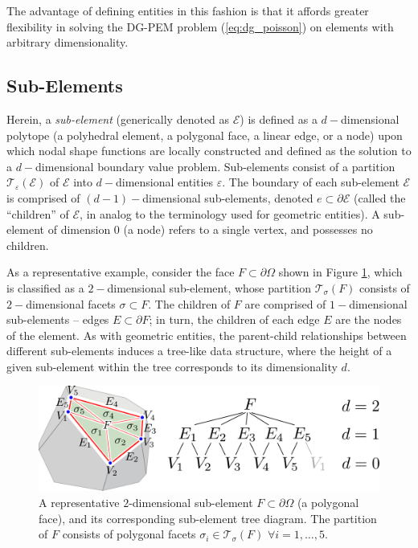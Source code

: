	The advantage of defining entities in this fashion is that it affords greater flexibility in solving the DG-PEM problem (\ref{eq:dg_poisson}) on elements with arbitrary dimensionality.
	
\subsection*{Sub-Elements}

	Herein, a \textit{sub-element} (generically denoted as $\mathcal{E}$) is defined as a $d-$dimensional polytope (a polyhedral element, a polygonal face, a linear edge, or a node) upon which nodal shape functions are locally constructed and defined as the solution to a $d-$dimensional boundary value problem. Sub-elements consist of a partition $\mathcal{T}_{\varepsilon} (\mathcal{E})$ of $\mathcal{E}$ into $d-$dimensional entities $\varepsilon$. The boundary of each sub-element $\mathcal{E}$ is comprised of $(d-1)-$dimensional sub-elements, denoted $e \subset \partial \mathcal{E}$ (called the ``children'' of $\mathcal{E}$, in analog to the terminology used for geometric entities). A sub-element of dimension $0$ (a node) refers to a single vertex, and possesses no children.
	
	As a representative example, consider the face $F \subset \partial \Omega$ shown in Figure \ref{fig:sub_element}, which is classified as a $2-$dimensional sub-element, whose partition $\mathcal{T}_\sigma (F)$ consists of $2-$dimensional facets $\sigma \subset F$. The children of $F$ are comprised of $1-$dimensional sub-elements -- edges $E \subset \partial F$; in turn, the children of each edge $E$ are the nodes of the element. As with geometric entities, the parent-child relationships between different sub-elements induces a tree-like data structure, where the height of a given sub-element within the tree corresponds to its dimensionality $d$.
	\begin{figure} [!ht]
		\centering
		\includegraphics[width = 6.0in]{figures/sub_element.pdf}
		\caption{A representative $2$-dimensional sub-element $F \subset \partial \Omega$ (a polygonal face), and its corresponding sub-element tree diagram. The partition of $F$ consists of polygonal facets $\sigma_i \in \mathcal{T}_{\sigma} (F) \, \, \forall i = 1, \ldots, 5$.}
		\label{fig:sub_element}
	\end{figure}
	
